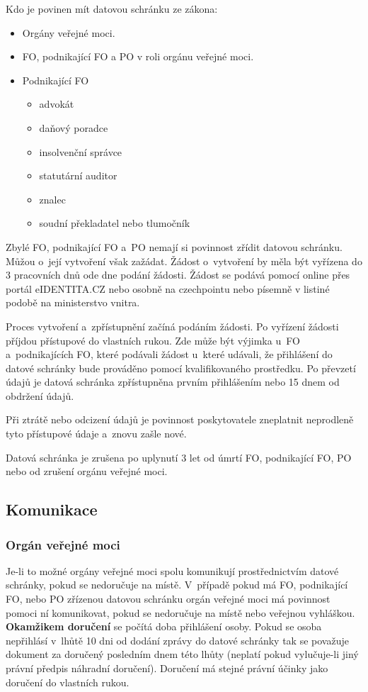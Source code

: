 Kdo je povinen mít datovou schránku ze zákona:
\begin{itemize}[noitemsep]
    \item Orgány veřejné moci.
    \item FO, podnikající FO a PO v roli orgánu veřejné moci.
    \item Podnikající FO
    \begin{itemize}
        \item advokát
        \item daňový poradce
        \item insolvenční správce
        \item statutární auditor
        \item znalec
        \item soudní překladatel nebo tlumočník
    \end{itemize}
\end{itemize}

Zbylé FO, podnikající FO a~PO nemají si povinnost zřídit datovou schránku. Můžou o~její vytvoření však zažádat. Žádost o~vytvoření by měla být vyřízena do 3 pracovních dnů ode dne podání žádosti. Žádost se podává pomocí online přes portál eIDENTITA.CZ nebo osobně na czechpointu nebo písemně v listiné podobě na ministerstvo vnitra.

Proces vytvoření a~zpřístupnění začíná podáním žádosti. Po vyřízení žádosti příjdou přístupové do vlastních rukou. Zde může být výjimka u~FO a~podnikajících FO, které podávali žádost u~které udávali, že přihlášení do datové schránky bude prováděno pomocí kvalifikovaného prostředku. Po převzetí údajů je datová schránka zpřístupněna prvním přihlášením nebo 15 dnem od obdržení údajů.

Při ztrátě nebo odcizení údajů je povinnost poskytovatele zneplatnit neprodleně tyto přístupové údaje a~znovu zašle nové.

Datová schránka je zrušena po uplynutí 3 let od úmrtí FO, podnikající FO, PO nebo od zrušení orgánu veřejné moci.

\subsection{Komunikace}

\subsubsection{Orgán veřejné moci}
Je-li to možné orgány veřejné moci spolu komunikují prostřednictvím datové schránky, pokud se nedoručuje na místě. V~případě pokud má FO, podnikající FO, nebo PO zřízenou datovou schránku orgán veřejné moci má povinnost pomoci ní komunikovat, pokud se nedoručuje na místě nebo veřejnou vyhláškou. \textbf{Okamžikem doručení} se počítá doba přihlášení osoby. Pokud se osoba nepřihlásí v~lhůtě 10 dni od dodání zprávy do datové schránky tak se považuje dokument za doručený posledním dnem této lhůty (neplatí pokud vylučuje-li jiný právní předpis náhradní doručení). Doručení má stejné právní účinky jako doručení do vlastních rukou.

